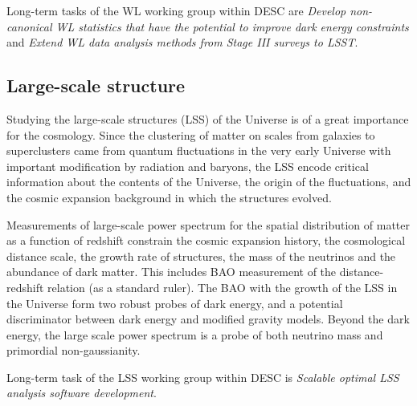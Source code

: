 Long-term tasks of the WL working group within DESC are \textit{Develop non-canonical WL statistics that have the potential to improve
dark energy constraints} and \textit{Extend WL data analysis methods from Stage III surveys to LSST}.
\subsection{Large-scale structure}
Studying the large-scale structures (LSS) of the Universe is of a great importance for the cosmology. Since the clustering of matter on scales from galaxies to superclusters came from quantum fluctuations in the very early Universe with important modification by radiation and baryons, the LSS encode critical information about the contents of the Universe, the origin of the fluctuations, and the cosmic expansion background in which the structures evolved.

Measurements of large-scale power spectrum for the spatial distribution of matter as a function of redshift constrain the cosmic expansion history, the cosmological distance scale, the growth rate of structures, the mass of the neutrinos and the abundance of dark matter. This includes BAO measurement of the distance-redshift relation (as a standard ruler). The BAO with the growth of the LSS in the Universe form two robust probes of dark energy, and a potential discriminator between dark energy and modified gravity models. Beyond the dark energy, the large scale power spectrum is a probe of both neutrino mass and primordial non-gaussianity.

Long-term task of the LSS working group within DESC is \textit{Scalable optimal LSS analysis software development}.
